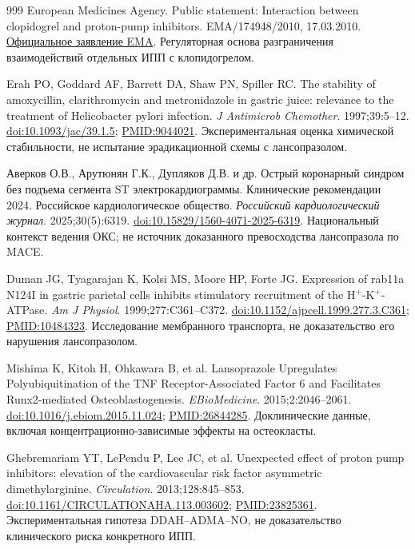 \documentclass[11pt,a4paper,notitlepage]{report}
\begin{document}
\begin{thebibliography}{999}
 European Medicines Agency. Public statement: Interaction between clopidogrel and proton-pump inhibitors. EMA/174948/2010, 17.03.2010. \href{https://www.ema.europa.eu/en/documents/public-statement/public-statement-interaction-between-clopidogrel-and-proton-pump-inhibitors_en.pdf}{Официальное заявление EMA}. Регуляторная основа разграничения взаимодействий отдельных ИПП с клопидогрелом.

 Erah PO, Goddard AF, Barrett DA, Shaw PN, Spiller RC. The stability of amoxycillin, clarithromycin and metronidazole in gastric juice: relevance to the treatment of Helicobacter pylori infection. \textit{J Antimicrob Chemother}. 1997;39:5--12. \href{https://doi.org/10.1093/jac/39.1.5}{doi:10.1093/jac/39.1.5}; \href{https://pubmed.ncbi.nlm.nih.gov/9044021/}{PMID:9044021}. Экспериментальная оценка химической стабильности, не испытание эрадикационной схемы с лансопразолом.

 Аверков О.В., Арутюнян Г.К., Дупляков Д.В. и др. Острый коронарный синдром без подъема сегмента ST электрокардиограммы. Клинические рекомендации 2024. Российское кардиологическое общество. \textit{Российский кардиологический журнал}. 2025;30(5):6319. \href{https://doi.org/10.15829/1560-4071-2025-6319}{doi:10.15829/1560-4071-2025-6319}. Национальный контекст ведения ОКС; не источник доказанного превосходства лансопразола по MACE.

 Duman JG, Tyagarajan K, Kolsi MS, Moore HP, Forte JG. Expression of rab11a N124I in gastric parietal cells inhibits stimulatory recruitment of the H$^+$-K$^+$-ATPase. \textit{Am J Physiol}. 1999;277:C361--C372. \href{https://doi.org/10.1152/ajpcell.1999.277.3.C361}{doi:10.1152/ajpcell.1999.277.3.C361}; \href{https://pubmed.ncbi.nlm.nih.gov/10484323/}{PMID:10484323}. Исследование мембранного транспорта, не доказательство его нарушения лансопразолом.

 Mishima K, Kitoh H, Ohkawara B, et al. Lansoprazole Upregulates Polyubiquitination of the TNF Receptor-Associated Factor 6 and Facilitates Runx2-mediated Osteoblastogenesis. \textit{EBioMedicine}. 2015;2:2046--2061. \href{https://doi.org/10.1016/j.ebiom.2015.11.024}{doi:10.1016/j.ebiom.2015.11.024}; \href{https://pubmed.ncbi.nlm.nih.gov/26844285/}{PMID:26844285}. Доклинические данные, включая концентрационно-зависимые эффекты на остеокласты.

 Ghebremariam YT, LePendu P, Lee JC, et al. Unexpected effect of proton pump inhibitors: elevation of the cardiovascular risk factor asymmetric dimethylarginine. \textit{Circulation}. 2013;128:845--853. \href{https://doi.org/10.1161/CIRCULATIONAHA.113.003602}{doi:10.1161/CIRCULATIONAHA.113.003602}; \href{https://pubmed.ncbi.nlm.nih.gov/23825361/}{PMID:23825361}. Экспериментальная гипотеза DDAH--ADMA--NO, не доказательство клинического риска конкретного ИПП.


\end{thebibliography}
\end{document}
